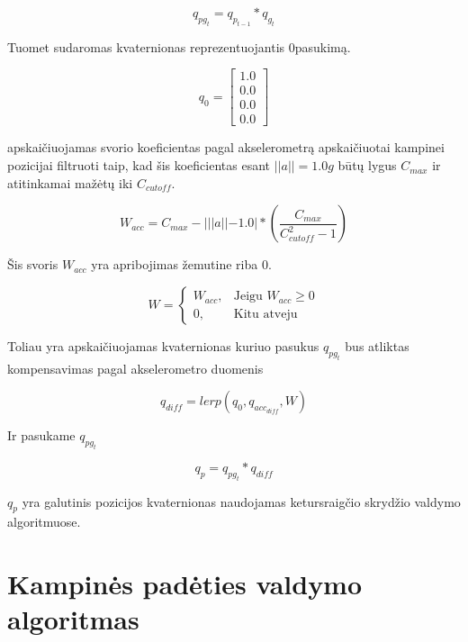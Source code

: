 \documentclass[12pt, a4paper, lithuanian, final]{article}
\begin{document}
\begin{equation}
	q_{pg_t} = q_{p_{t-1}} * q_{g_t}
\end{equation}

Tuomet sudaromas kvaternionas reprezentuojantis 0\degree pasukimą.

\begin{equation}
	q_{0} = \left[
		\begin{array}{c}
			1.0 \\
			0.0 \\
			0.0 \\
			0.0
		\end{array}
	\right]
\end{equation}

apskaičiuojamas svorio koeficientas pagal akselerometrą apskaičiuotai kampinei pozicijai filtruoti taip, kad šis koeficientas esant $||a|| = 1.0g$ būtų lygus $C_{max}$ ir atitinkamai mažėtų iki $C_{cutoff}$.

\begin{equation}
	W_{acc} = C_{max} - | ||a|| - 1.0 | * (\dfrac{C_{max}}{C_{cutoff}^2 - 1} )
\end{equation}

Šis svoris $W_{acc}$ yra apribojimas žemutine riba 0.

\begin{equation}
	W = \begin{cases}
		W_{acc}, & \text{Jeigu } W_{acc} \geq 0\\
		0, & \text{Kitu atveju}
	\end{cases}
\end{equation}


Toliau yra apskaičiuojamas kvaternionas kuriuo pasukus $q_{pg_t}$ bus atliktas kompensavimas pagal akselerometro duomenis

\begin{equation}
	q_{diff} = lerp(q_{0}, q_{acc_{diff}}, W)
\end{equation}

Ir pasukame $q_{pg_t}$

\begin{equation}
	q_{p} = q_{pg_t} * q_{diff}
\end{equation}

$q_{p}$ yra galutinis pozicijos kvaternionas naudojamas ketursraigčio skrydžio valdymo algoritmuose.





\section{Kampinės padėties valdymo algoritmas}
\end{document}
